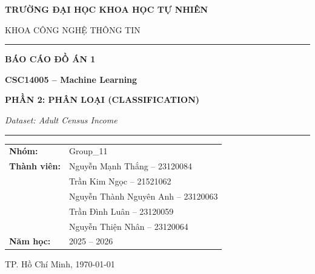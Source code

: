 \documentclass[12pt, a4paper]{article}
\begin{document}
\begin{titlepage}
  \centering
  \vspace*{1.5cm}
  {\Large \textbf{TRƯỜNG ĐẠI HỌC KHOA HỌC TỰ NHIÊN}\par}
  {\large KHOA CÔNG NGHỆ THÔNG TIN\par}
  \vspace{1cm}
  \rule{\linewidth}{0.5pt}
  \vspace{0.8cm}

  {\LARGE \textbf{BÁO CÁO ĐỒ ÁN 1}\par}
  \vspace{0.4cm}
  {\Large \textbf{CSC14005 -- Machine Learning}\par}
  \vspace{0.4cm}
  {\large \textbf{PHẦN 2: PHÂN LOẠI (CLASSIFICATION)}\par}
  \vspace{0.4cm}
  {\large \textit{Dataset: Adult Census Income}\par}

  \rule{\linewidth}{0.5pt}
  \vspace{1.5cm}

  \begin{tabular}{ll}
    \textbf{Nhóm:}     & Group\_11 \\[4pt]
    \textbf{Thành viên:} & Nguyễn Mạnh Thắng -- 23120084\\
                         & Trần Kim Ngọc  -- 21521062 \\
                         & Nguyễn Thành Nguyên Anh -- 23120063 \\
                         & Trần Đình Luân -- 23120059 \\
                         & Nguyễn Thiện Nhân -- 23120064 \\
    \textbf{Năm học:}  & 2025 -- 2026 \\
  \end{tabular}

  \vfill
  {\large TP. Hồ Chí Minh, \today\par}
\end{titlepage}

\tableofcontents
\newpage

\end{document}
